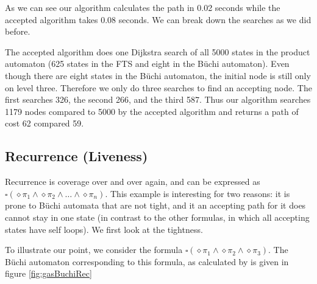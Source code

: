 As we can see our algorithm calculates the path in 0.02 seconds while the accepted algorithm takes 0.08 seconds. We can break down the searches as we did before. 

The accepted algorithm does one Dijkstra search of all 5000 states in the product automaton (625 states in the FTS and eight in the B\"uchi automaton). Even though there are eight states in the B\"uchi automaton, the initial node is still only on level three. Therefore we only do three searches to find an accepting node. The first searches 326, the second 266, and the third 587. Thus our algorithm searches 1179 nodes compared to 5000 by the accepted algorithm and returns a path of cost 62 compared 59.
\subsection{Recurrence (Liveness)}
Recurrence is coverage over and over again, and can be expressed as $\square(\diamond \pi_1 \land \diamond \pi_2 \land \dots \land \diamond \pi_n)$. This example is interesting for two reasons: it is prone to B\"{u}chi automata that are not tight, and it an accepting path for it does cannot stay in one state (in contrast to the other formulas, in which all accepting states have self loops). We first look at the tightness.

To illustrate our point, we consider the formula $\square(\diamond \pi_1 \land \diamond \pi_2 \land \diamond \pi_3)$. The B\"{u}chi automaton corresponding to this formula, as calculated by \cite{gastin01} is given in figure \ref{fig:gasBuchiRec}

